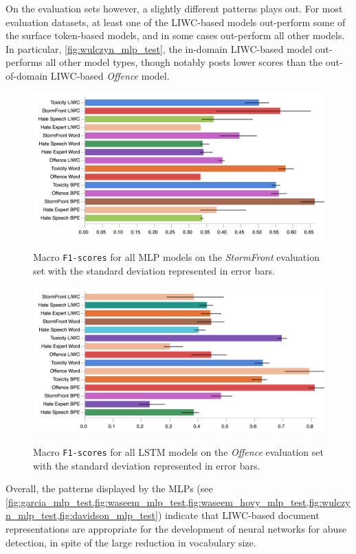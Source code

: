 On the evaluation sets however, a slightly different patterns plays out. 
For most evaluation datasets, at least one of the LIWC-based models out-perform some of the surface token-based models, and in some cases out-perform all other models.
In particular, \cref{fig:wulczyn_mlp_test}, the in-domain LIWC-based model out-performs all other model types, though notably posts lower scores than the out-of-domain LIWC-based \textit{Offence} model.

\begin{figure}
\begin{minipage}{\textwidth}
\centering
  \includegraphics[width=\textwidth]{all_mlp_garcia_test.pdf}
  \caption{Macro \texttt{F1-scores} for all MLP models on the \textit{StormFront} evaluation set with the standard deviation represented in error bars.}
  \label{fig:garcia_mlp_test}
  \vfill
    \includegraphics[width=\textwidth]{all_lstm_davidson_test.pdf}
    \caption{Macro \texttt{F1-scores} for all LSTM models on the \textit{Offence} evaluation set with the standard deviation represented in error bars.}
    \label{fig:davidson_lstm_test}
  \end{minipage}
\end{figure}

Overall, the patterns displayed by the MLPs (see \cref{fig:garcia_mlp_test,fig:waseem_mlp_test,fig:waseem_hovy_mlp_test,fig:wulczyn_mlp_test,fig:davidson_mlp_test}) indicate that LIWC-based document representations are appropriate for the development of neural networks for abuse detection, in spite of the large reduction in vocabulary size.

